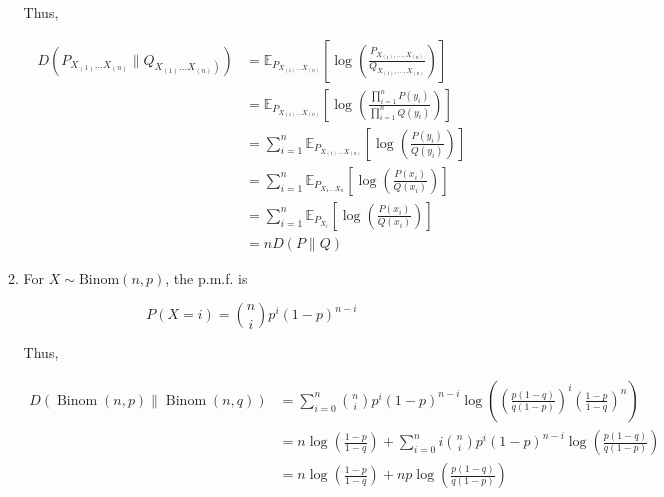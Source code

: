 \documentclass[a4paper]{article}
\begin{document}
\begin{enumerate}
\begin{enumerate}
       Thus,

       \begin{equation}
        \begin{aligned}
          D\left(P_{X_{(1)} \ldots X_{(n)}} \| Q_{\left.X_{(1)} \ldots X_{(n)}\right)}\right) & = \mathbb{E}_{P_{X_{(1)} \ldots X_{(n)}}} \left[\log \left(\frac{P_{{X_{(1)}, \ldots, X_{(n)}}}}{Q_{{X_{(1)}, \ldots, X_{(n)}}}}\right)\right] \\
          & = \mathbb{E}_{P_{X_{(1)} \ldots X_{(n)}}} \left[\log \left(\frac{\prod_{i=1}^{n} P\left(y_{i}\right)}{\prod_{i=1}^{n} Q\left(y_{i}\right)}\right)\right] \\ 
          & = \sum_{i=1}^n \mathbb{E}_{P_{X_{(1)} \ldots X_{(n)}}} \left[\log \left(\frac{ P\left(y_{i}\right)}{ Q\left(y_{i}\right)}\right)\right] \\ 
          & = \sum_{i=1}^n \mathbb{E}_{P_{X_{1} \ldots X_{n}}} \left[\log \left(\frac{ P\left(x_{i}\right)}{ Q\left(x_{i}\right)}\right)\right] \\
          & = \sum_{i=1}^n \mathbb{E}_{P_{X_{i}}} \left[\log \left(\frac{ P\left(x_{i}\right)}{ Q\left(x_{i}\right)}\right)\right] \\
          & = nD(P\| Q)
        \end{aligned}
       \end{equation}

       \item For $X\sim \text{Binom}(n,p)$, the p.m.f. is 
       
       \begin{equation}
         P(X=i) = \binom{n}{i}p^i (1-p)^{n-i}
       \end{equation}

       Thus,

       \begin{equation}
        \begin{aligned}
          D(\operatorname{Binom}(n, p) \| \operatorname{Binom}(n, q)) &= \sum_{i=0}^n \binom{n}{i}p^i (1-p)^{n-i} \log \left(\left(\frac {p(1-q)}{q(1-p)}\right)^ i \left(\frac {1-p}{1-q}\right)^n\right) \\
          & = n\log \left(\frac {1-p}{1-q}\right) +  \sum_{i=0}^n i\binom{n}{i}p^i (1-p)^{n-i} \log \left(\frac {p(1-q)}{q(1-p)}\right) \\
          & = n\log \left(\frac {1-p}{1-q}\right) + np \log \left(\frac {p(1-q)}{q(1-p)}\right)
        \end{aligned}
      \end{equation}


\end{enumerate}
\end{enumerate}
\end{document}
